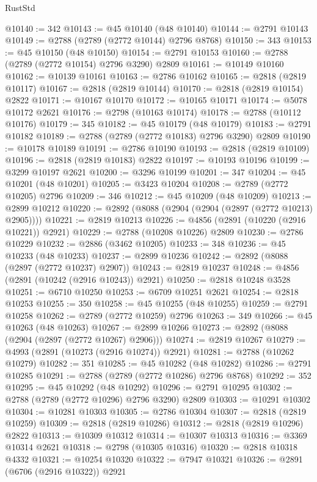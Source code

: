 \begin{lexlean}{RustStd}
\begin{coremodule}
@10140 := 342
@10143 := @45 @10140 (@48 @10140)
@10144 := @2791 @10143
@10149 := @2788 (@2789 (@2772 @10144) @2796 @8768)
@10150 := 343
@10153 := @45 @10150 (@48 @10150)
@10154 := @2791 @10153
@10160 := @2788 (@2789 (@2772 @10154) @2796 @3290) @2809
@10161 := @10149 @10160
@10162 := @10139 @10161
@10163 := @2786 @10162
@10165 := @2818 (@2819 @10117)
@10167 := @2818 (@2819 @10144)
@10170 := @2818 (@2819 @10154) @2822
@10171 := @10167 @10170
@10172 := @10165 @10171
@10174 := @5078 @10172 @2621
@10176 := @2798 (@10163 @10174)
@10178 := @2788 (@10112 @10176)
@10179 := 345
@10182 := @45 @10179 (@48 @10179)
@10183 := @2791 @10182
@10189 := @2788 (@2789 (@2772 @10183) @2796 @3290) @2809
@10190 := @10178 @10189
@10191 := @2786 @10190
@10193 := @2818 (@2819 @10109)
@10196 := @2818 (@2819 @10183) @2822
@10197 := @10193 @10196
@10199 := @3299 @10197 @2621
@10200 := @3296 @10199
@10201 := 347
@10204 := @45 @10201 (@48 @10201)
@10205 := @3423 @10204
@10208 := @2789 (@2772 @10205) @2796
@10209 := 346
@10212 := @45 @10209 (@48 @10209)
@10213 := @2899 @10212
@10220 := @2892 (@8088 (@2904 (@2904 (@2897 (@2772 @10213) @2905))))
@10221 := @2819 @10213
@10226 := @4856 (@2891 (@10220 (@2916 @10221)) @2921)
@10229 := @2788 (@10208 @10226) @2809
@10230 := @2786 @10229
@10232 := @2886 (@3462 @10205)
@10233 := 348
@10236 := @45 @10233 (@48 @10233)
@10237 := @2899 @10236
@10242 := @2892 (@8088 (@2897 (@2772 @10237) @2907))
@10243 := @2819 @10237
@10248 := @4856 (@2891 (@10242 (@2916 @10243)) @2921)
@10250 := @2818 @10248 @3528
@10251 := @6710 @10250
@10253 := @6709 @10251 @2621
@10254 := @2818 @10253
@10255 := 350
@10258 := @45 @10255 (@48 @10255)
@10259 := @2791 @10258
@10262 := @2789 (@2772 @10259) @2796
@10263 := 349
@10266 := @45 @10263 (@48 @10263)
@10267 := @2899 @10266
@10273 := @2892 (@8088 (@2904 (@2897 (@2772 @10267) @2906)))
@10274 := @2819 @10267
@10279 := @4993 (@2891 (@10273 (@2916 @10274)) @2921)
@10281 := @2788 (@10262 @10279)
@10282 := 351
@10285 := @45 @10282 (@48 @10282)
@10286 := @2791 @10285
@10291 := @2788 (@2789 (@2772 @10286) @2796 @8768)
@10292 := 352
@10295 := @45 @10292 (@48 @10292)
@10296 := @2791 @10295
@10302 := @2788 (@2789 (@2772 @10296) @2796 @3290) @2809
@10303 := @10291 @10302
@10304 := @10281 @10303
@10305 := @2786 @10304
@10307 := @2818 (@2819 @10259)
@10309 := @2818 (@2819 @10286)
@10312 := @2818 (@2819 @10296) @2822
@10313 := @10309 @10312
@10314 := @10307 @10313
@10316 := @3369 @10314 @2621
@10318 := @2798 (@10305 @10316)
@10320 := @2818 @10318 @4332
@10321 := @10254 @10320
@10322 := @7947 @10321
@10326 := @2891 (@6706 (@2916 @10322)) @2921

\end{coremodule}
\end{lexlean}
